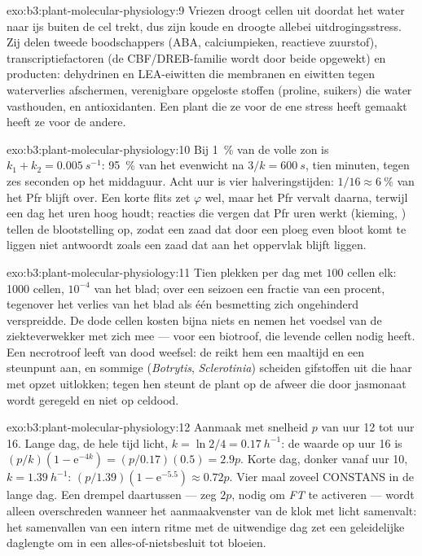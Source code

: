 \begin{solution}{exo:b3:plant-molecular-physiology:9}
Vriezen droogt cellen uit doordat het water naar ijs buiten de cel
trekt, dus zijn koude en droogte allebei uitdrogingsstress. Zij delen
tweede boodschappers (ABA, calciumpieken, reactieve zuurstof),
transcriptiefactoren (de CBF/DREB-familie wordt door beide opgewekt) en
producten: dehydrinen en LEA-eiwitten die membranen en eiwitten tegen
waterverlies afschermen, verenigbare opgeloste stoffen (proline,
suikers) die water vasthouden, en antioxidanten. Een plant die ze voor
de ene stress heeft gemaakt heeft ze voor de andere.
\end{solution}

\begin{solution}{exo:b3:plant-molecular-physiology:10}
Bij \qty{1}{\%} van de volle zon is $k_{1} + k_{2} = \qty{0.005}{s^{-1}}$:
95~\% van het evenwicht na $3/k = \qty{600}{s}$, tien minuten, tegen
zes seconden op het middaguur. Acht uur is vier halveringstijden: $1/16 \approx
\qty{6}{\%}$ van het Pfr blijft over. Een korte flits zet
$\varphi$ wel, maar het Pfr vervalt daarna, terwijl een dag het uren
hoog houdt; reacties die vergen dat Pfr uren werkt (kieming,
) tellen de blootstelling op, zodat een zaad dat door een
ploeg even bloot komt te liggen niet antwoordt zoals een zaad dat aan
het oppervlak blijft liggen.
\end{solution}

\begin{solution}{exo:b3:plant-molecular-physiology:11}
Tien plekken per dag met $100$ cellen elk: \num{1000} cellen, $10^{-4}$
van het blad; over een seizoen een fractie van een procent, tegenover
het verlies van het blad als één besmetting zich ongehinderd
verspreidde. De dode cellen kosten bijna niets en nemen het voedsel van
de ziekteverwekker met zich mee --- voor een biotroof, die levende
cellen nodig heeft. Een necrotroof leeft van dood weefsel: de
 reikt hem een maaltijd en een steunpunt aan,
en sommige (\emph{Botrytis}, \emph{Sclerotinia}) scheiden gifstoffen
uit die haar met opzet uitlokken; tegen hen steunt de plant op de
afweer die door jasmonaat wordt geregeld en niet op celdood.
\end{solution}

\begin{solution}{exo:b3:plant-molecular-physiology:12}
Aanmaak met snelheid $p$ van uur 12 tot uur 16. Lange dag, de hele tijd
licht, $k = \ln 2/4 = \qty{0.17}{h^{-1}}$: de waarde op uur 16 is $(p/k)(1 -
\mathrm{e}^{-4k}) = (p/0.17)(0.5) = 2.9p$. Korte dag, donker vanaf uur
10, $k = \qty{1.39}{h^{-1}}$: $(p/1.39)(1 - \mathrm{e}^{-5.5})
\approx 0.72p$. Vier maal zoveel CONSTANS in de lange dag. Een drempel
daartussen --- zeg $2p$, nodig om \emph{FT} te activeren --- wordt
alleen overschreden wanneer het aanmaakvenster van de klok met licht
samenvalt: het samenvallen van een intern ritme met de uitwendige dag
zet een geleidelijke daglengte om in een alles-of-nietsbesluit tot
bloeien.
\end{solution}

